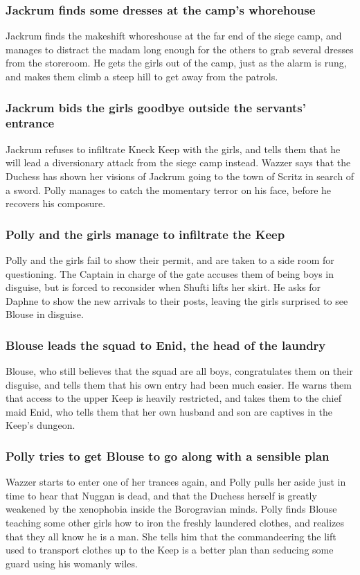 \subsubsection{\Gls{Jackrum} finds some dresses at the camp's whorehouse}
\Gls{Jackrum} finds the makeshift whoreshouse at the far end of the siege camp, and manages to
distract the madam long enough for the others to grab several dresses from the storeroom. He gets
the girls out of the camp, just as the alarm is rung, and makes them climb a steep hill to get away
from the patrols.

\subsubsection{\Gls{Jackrum} bids the girls goodbye outside the servants' entrance}
\Gls{Jackrum} refuses to infiltrate Kneck Keep with the girls, and tells them that he will lead
a diversionary attack from the siege camp instead. \Gls{Wazzer} says that the \Gls{Duchess} has
shown her visions of \Gls{Jackrum} going to the town of Scritz in search of a sword. \Gls{Polly}
manages to catch the momentary terror on his face, before he recovers his composure.

\subsubsection{\Gls{Polly} and the girls manage to infiltrate the Keep}
\Gls{Polly} and the girls fail to show their permit, and are taken to a side room for questioning.
The Captain in charge of the gate accuses them of being boys in disguise, but is forced to
reconsider when \Gls{Shufti} lifts her skirt. He asks for \Gls{Daphne} to show the new arrivals to
their posts, leaving the girls surprised to see \Gls{Blouse} in disguise.

\subsubsection{\Gls{Blouse} leads the squad to \Gls{Enid}, the head of the laundry}
\Gls{Blouse}, who still believes that the squad are all boys, congratulates them on their disguise,
and tells them that his own entry had been much easier. He warns them that access to the upper
Keep is heavily restricted, and takes them to the chief maid \Gls{Enid}, who tells them that her
own husband and son are captives in the Keep's dungeon.

\subsubsection{\Gls{Polly} tries to get \Gls{Blouse} to go along with a sensible plan}
\Gls{Wazzer} starts to enter one of her trances again, and \Gls{Polly} pulls her aside just in time
to hear that \Gls{Nuggan} is dead, and that the \Gls{Duchess} herself is greatly weakened by the
xenophobia inside the Borogravian minds. \Gls{Polly} finds \Gls{Blouse} teaching some other girls
how to iron the freshly laundered clothes, and realizes that they all know he is a man. She tells
him that the commandeering the lift used to transport clothes up to the Keep is a better plan than
seducing some guard using his womanly wiles.

